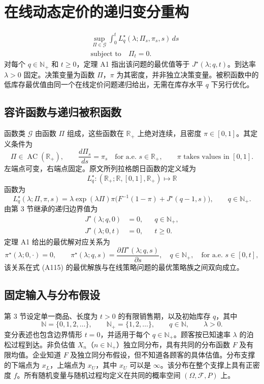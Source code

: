 \documentclass{article}
\begin{document}
\section*{在线动态定价的递归变分重构}
\begin{equation}
\begin{aligned}
&\sup_{\Pi\in\mathcal G}\int_0^t L_q^\star(\lambda;\Pi_s,\pi_s,s)\,ds\\
&\text{subject to}\quad \Pi_t=0.
\end{aligned}\tag{A115}
\end{equation}
对每个 $q\in\mathbb N_+$ 和 $t\geq0$，定理 A1 指出该问题的最优值等于 $J^\star(\lambda;q,t)$。到达率 $\lambda>0$ 固定。决策变量为函数 $\Pi$，$\pi$ 为其密度，并非独立决策变量。被积函数中的低库存最优值由同一个在线定价问题递归给出，无需在库存水平 $q$ 下另行优化。

\subsection*{容许函数与递归被积函数}
函数类 $\mathcal G$ 由函数 $\Pi$ 组成，这些函数在 $\mathbb R_+$ 上绝对连续，且密度 $\pi\in[0,1]$。其定义条件为
\[
\Pi\in\operatorname{AC}(\mathbb R_+),\qquad
\frac{d\Pi_s}{ds}=\pi_s\quad\text{for a.e. }s\in\mathbb R_+,
\qquad \pi\text{ takes values in }[0,1].
\]
左端点可变，右端点固定。原文所列拉格朗日函数的定义域为
\[
L_q^\star:(\mathbb R_+;\mathbb R,[0,1],\mathbb R_+)\longmapsto\mathbb R
\]
函数为
\begin{equation}
L_q^\star(\lambda;\Pi,\pi,s)
=\lambda\exp(\lambda\Pi)\pi\bigl(F^{-1}(1-\pi)+J^\star(q-1,s)\bigr),
\qquad q\in\mathbb N_+.
\tag{A116}
\end{equation}
由第 3 节继承的递归边界值为
\begin{equation}
\begin{aligned}
J^\star(\lambda;q,0)&=0,&&q\in\mathbb N_+,\\
J^\star(\lambda;0,t)&=0,&&t\geq0.
\end{aligned}\tag{4, boundary values}
\end{equation}
定理 A1 给出的最优解对应关系为
\[
\pi^\star(\lambda;0,\cdot)=0,\qquad
\pi^\star(\lambda;q,s)
=\frac{\partial\Pi^\star(\lambda;q,s)}{\partial s},
\quad q\in\mathbb N_+,\quad\text{for a.e. }s\in[0,t],
\]
该关系在式 (A115) 的最优解族与在线策略问题的最优策略族之间双向成立。

\subsection*{固定输入与分布假设}
第 3 节设定单一商品、长度为 $t>0$ 的有限销售期，以及初始库存 $q$，其中
\[
\mathbb N=\{0,1,2,\ldots\},\qquad
\mathbb N_+=\{1,2,\ldots\},\qquad
q\in\mathbb N,\qquad \lambda>0.
\]
变分表述也包含边界情形 $t=0$，并适用于每个 $q\in\mathbb N_+$。顾客按已知速率 $\lambda$ 的泊松过程到达。非负估值 $X_n$（$n\in\mathbb N_+$）独立同分布，具有共同的分布函数 $F$ 及有限均值。企业知道 $F$ 及独立同分布假设，但不知道各顾客的具体估值。分布支撑的下端点为 $x_L$，上端点为 $x_U$，其中 $x_U$ 可以是 $\infty$。该分布在整个支撑上具有正密度 $f$。所有随机变量与随机过程均定义在共同的概率空间 $(\Omega,\mathcal F,P)$ 上。
\end{document}

